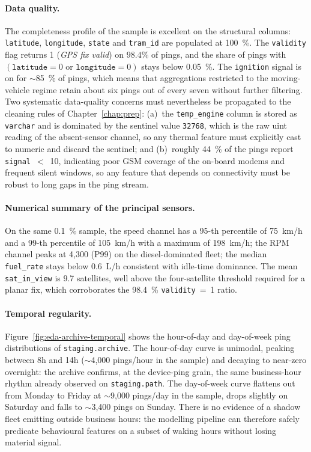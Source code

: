 \paragraph{Data quality.}
The completeness profile of the sample is excellent on the structural columns: \texttt{latitude}, \texttt{longitude}, \texttt{state} and \texttt{tram\_id} are populated at 100~\%. The \texttt{validity} flag returns 1 (\emph{GPS fix valid}) on $98.4\%$ of pings, and the share of pings with $(\texttt{latitude}=0 \text{ or } \texttt{longitude}=0)$ stays below 0.05~\%. The \texttt{ignition} signal is on for $\sim$85~\% of pings, which means that aggregations restricted to the moving-vehicle regime retain about six pings out of every seven without further filtering. Two systematic data-quality concerns must nevertheless be propagated to the cleaning rules of Chapter~\ref{chap:prep}: (a)~the \texttt{temp\_engine} column is stored as \texttt{varchar} and is dominated by the sentinel value \texttt{32768}, which is the raw uint reading of the absent-sensor channel, so any thermal feature must explicitly cast to numeric and discard the sentinel; and (b)~roughly 44~\% of the pings report \texttt{signal}~$<$~10, indicating poor GSM coverage of the on-board modems and frequent silent windows, so any feature that depends on connectivity must be robust to long gaps in the ping stream.

\paragraph{Numerical summary of the principal sensors.}
On the same 0.1~\% sample, the speed channel has a 95-th percentile of 75~km/h and a 99-th percentile of 105~km/h with a maximum of 198~km/h; the RPM channel peaks at 4{,}300 (P99) on the diesel-dominated fleet; the median \texttt{fuel\_rate} stays below 0.6~L/h consistent with idle-time dominance. The mean \texttt{sat\_in\_view} is 9.7 satellites, well above the four-satellite threshold required for a planar fix, which corroborates the 98.4~\% \texttt{validity}~=~1 ratio.

\paragraph{Temporal regularity.}
Figure~\ref{fig:eda-archive-temporal} shows the hour-of-day and day-of-week ping distributions of \texttt{staging.archive}. The hour-of-day curve is unimodal, peaking between 8h and 14h ($\sim$4{,}000 pings/hour in the sample) and decaying to near-zero overnight: the archive confirms, at the device-ping grain, the same business-hour rhythm already observed on \texttt{staging.path}. The day-of-week curve flattens out from Monday to Friday at $\sim$9{,}000 pings/day in the sample, drops slightly on Saturday and falls to $\sim$3{,}400 pings on Sunday. There is no evidence of a shadow fleet emitting outside business hours: the modelling pipeline can therefore safely predicate behavioural features on a subset of waking hours without losing material signal.

